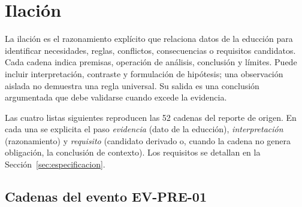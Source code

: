 
\section{Ilación}
\label{sec:ilacion}

La ilación es el razonamiento explícito que relaciona datos de la educción
para identificar necesidades, reglas, conflictos, consecuencias o
requisitos candidatos. Cada cadena indica premisas, operación de análisis,
conclusión y límites. Puede incluir interpretación, contraste y formulación
de hipótesis; una observación aislada no demuestra una regla universal. Su
salida es una conclusión argumentada que debe validarse cuando excede la
evidencia.

Las cuatro listas siguientes reproducen las 52 cadenas del reporte de
origen. En cada una se explicita el paso \emph{evidencia} (dato de la
educción), \emph{interpretación} (razonamiento) y \emph{requisito}
(candidato derivado o, cuando la cadena no genera obligación, la
conclusión de contexto). Los requisitos se detallan en la
Sección~\ref{sec:especificacion}.

\subsection{Cadenas del evento EV-PRE-01}
\label{subsec:ilacion-pre}

